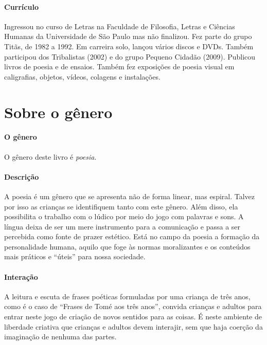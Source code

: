 \documentclass[11pt]{extarticle}
\begin{document}
\paragraph{Currículo} 
Ingressou no curso de Letras na Faculdade de Filosofia, Letras e Ciências Humanas 
da Universidade de São Paulo mas não finalizou.
Fez parte do grupo Titãs, de 1982 a 1992.
Em carreira solo, lançou vários discos e DVDs.
Também participou dos Tribalistas (2002) e do grupo Pequeno
Cidadão (2009).
Publicou livros de poesia e de ensaios.
Também fez exposições de poesia visual em caligrafias, objetos,
vídeos, colagens e instalações.

\section{Sobre o gênero}

\paragraph{O gênero} O gênero deste livro é \textit{poesia}. 


\paragraph{Descrição} A poesia é um gênero que se apresenta não de forma
linear, mas espiral. Talvez por isso as crianças se identifiquem
tanto com este gênero. Além disso, ela possibilita o trabalho com
o lúdico por meio do jogo com palavras e sons. A língua deixa de
ser um mere instrumento para a comunicação e passa a ser percebida
como fonte de prazer estético. Está no campo da poesia a formação da personalidade
humana, aquilo que foge às normas moralizantes e os conteúdos mais
práticos e ``úteis'' para nossa sociedade. 

\paragraph{Interação} A leitura e escuta de frases poéticas 
formuladas por uma criança de três anos, como é o caso de ``Frases de Tomé aos três anos'',
convida crianças e adultos para entrar neste jogo de criação de novos sentidos
para as coisas. É neste ambiente de liberdade criativa que crianças e adultos devem
interajir, sem que haja coerção da imaginação de nenhuma das partes. 
\end{document}
